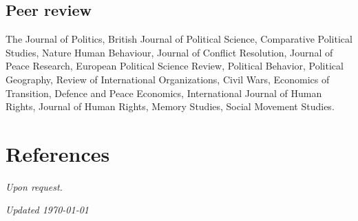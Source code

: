 \documentclass[a4paper, 12pt]{article}
\begin{document}
\subsection*{Peer review}

The Journal of Politics, British Journal of Political Science, Comparative Political Studies, Nature Human Behaviour, Journal of Conflict Resolution, Journal of Peace Research, European Political Science Review, Political Behavior, Political Geography, Review of International Organizations, Civil Wars, Economics of Transition, Defence and Peace Economics, International Journal of Human Rights, Journal of Human Rights, Memory Studies, Social Movement Studies.


\section*{References}

\textit{Upon request.}

%
%
%

\vfill

\noindent
\flushright
{\small\it Updated \monthdate\today}
\end{document}
